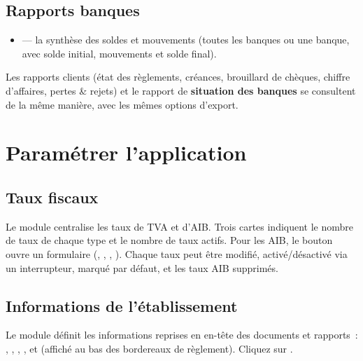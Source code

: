 \subsection{Rapports banques}

\begin{itemize}
  \item {} — la synthèse des soldes et mouvements (toutes les banques ou une banque, avec solde initial, mouvements et solde final).
\end{itemize}


Les rapports clients (état des règlements, créances, brouillard de chèques, chiffre d'affaires, pertes \& rejets) et le rapport de \textbf{situation des banques} se consultent de la même manière, avec les mêmes options d'export.

\section{Paramétrer l'application}

\subsection{Taux fiscaux}

Le module  centralise les taux de TVA et d'AIB. Trois cartes indiquent le nombre de taux de chaque type et le nombre de taux actifs. Pour les AIB, le bouton  ouvre un formulaire (, , , ). Chaque taux peut être modifié, activé/désactivé via un interrupteur, marqué par défaut, et les taux AIB supprimés.


\subsection{Informations de l'établissement}

Le module  définit les informations reprises en en-tête des documents et rapports~: , , , ,  et  (affiché au bas des bordereaux de règlement). Cliquez sur .

